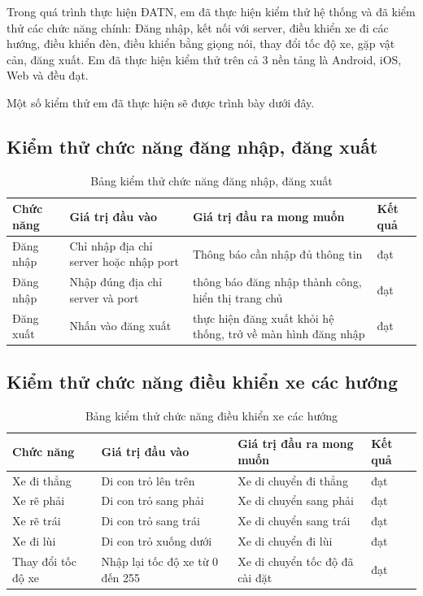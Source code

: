 \documentclass[../DoAn.tex]{subfiles}
\begin{document}
Trong quá trình thực hiện ĐATN, em đã thực hiện kiểm thử hệ thống và đã kiểm thử các chức năng chính: Đăng nhập, kết nối với server, điều khiển xe đi các hướng, điều khiển đèn, điều khiển bằng giọng nói, thay đổi tốc độ xe, gặp vật cản, đăng xuất. Em đã thực hiện kiểm thử trên cả 3 nền tảng là Android, iOS, Web và đều đạt.

Một số kiểm thử em đã thực hiện sẽ được trình bày dưới đây.

\subsection{Kiểm thử chức năng đăng nhập, đăng xuất}

\begin{table}[H]
\begin{tabular}{| p{3cm} | p{4cm} | p{5cm} | p{2cm} |}
\hline
\rowcolor[HTML]{FFCE93} 
\textbf{Chức năng} & \textbf{Giá trị đầu vào}       & \textbf{Giá trị đầu ra mong muốn}                            & Kết quả \\ \hline
Đăng nhập          & Chỉ nhập địa chỉ server hoặc nhập port  & Thông báo cần nhập đủ thông tin                               & đạt     \\ \hline
Đăng nhập          & Nhập đúng địa chỉ server và port & thông báo đăng nhập thành công, hiển thị trang chủ           & đạt     \\ \hline
Đăng xuất          & Nhấn vào đăng xuất             & thực hiện đăng xuất khỏi hệ thống, trở về màn hình đăng nhập & đạt     \\ \hline
\end{tabular}
\caption{Bảng kiểm thử chức năng đăng nhập, đăng xuất}
\end{table}

\subsection{Kiểm thử chức năng điều khiển xe các hướng}

\begin{table}[H]
\begin{tabular}{| p{3cm} | p{4cm} | p{5cm} | p{2cm} |}
\hline
\rowcolor[HTML]{FFCE93} 
\textbf{Chức năng} & \textbf{Giá trị đầu vào}       & \textbf{Giá trị đầu ra mong muốn}                            & Kết quả \\ \hline
Xe đi thẳng          & Di con trỏ lên trên  & Xe di chuyển đi thẳng                               & đạt     \\ \hline
Xe rẽ phải          & Di con trỏ sang phải & Xe di chuyển sang phải           & đạt     \\ \hline
Xe rẽ trái          & Di con trỏ sang trái             & Xe di chuyển sang trái & đạt     \\ \hline
Xe đi lùi          & Di con trỏ xuống dưới             & Xe di chuyển đi lùi & đạt     \\ \hline
Thay đổi tốc độ xe          & Nhập lại tốc độ xe từ 0 đến 255             & Xe di chuyển tốc độ đã cài đặt & đạt     \\ \hline
\end{tabular}
\caption{Bảng kiểm thử chức năng điều khiển xe các hướng}
\end{table}
\end{document}
